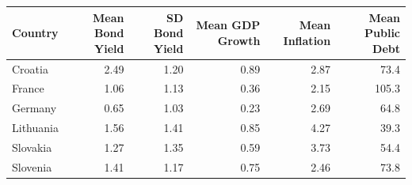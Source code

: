 \begin{tabular}{lrrrrr}
\hline
Country & Mean Bond Yield & SD Bond Yield & Mean GDP Growth & Mean Inflation & Mean Public Debt \\
\hline
Croatia & 2.49 & 1.20 & 0.89 & 2.87 & 73.4 \\
France & 1.06 & 1.13 & 0.36 & 2.15 & 105.3 \\
Germany & 0.65 & 1.03 & 0.23 & 2.69 & 64.8 \\
Lithuania & 1.56 & 1.41 & 0.85 & 4.27 & 39.3 \\
Slovakia & 1.27 & 1.35 & 0.59 & 3.73 & 54.4 \\
Slovenia & 1.41 & 1.17 & 0.75 & 2.46 & 73.8 \\
\hline
\end{tabular}
